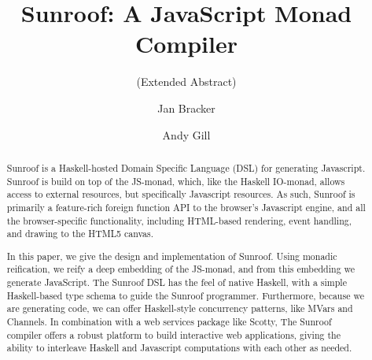 \documentclass{llncs}
\begin{document}
%
\title{Sunroof: A JavaScript Monad Compiler}
\subtitle{(Extended Abstract)}
%
%
\author{Jan Bracker  \and Andy Gill}
%
%
%


\maketitle              %

\begin{abstract}        

Sunroof is a Haskell-hosted Domain Specific Language (DSL) for generating Javascript.
Sunroof is build on top of the JS-monad, which, like the Haskell IO-monad, allows 
access to external resources, but specifically Javascript
resources. As such, Sunroof is primarily a feature-rich foreign
function API to the browser's Javascript engine, and all the browser-specific
functionality, including HTML-based rendering, event handling, and 
drawing to the HTML5 canvas. 

In this paper, we give the design and implementation of Sunroof.
Using monadic reification, we reify a deep embedding of the JS-monad,
and from this embedding we generate JavaScript.
The Sunroof DSL has the feel of native Haskell, with a simple
Haskell-based type schema to guide the Sunroof programmer.
Furthermore, because we are generating code,
we can offer Haskell-style concurrency patterns, like MVars and Channels.
In combination with a web services package like Scotty,
The Sunroof compiler offers a robust platform to build interactive web applications,
giving the ability to interleave Haskell and Javascript computations
with each other as needed.
\end{abstract}
\end{document}
